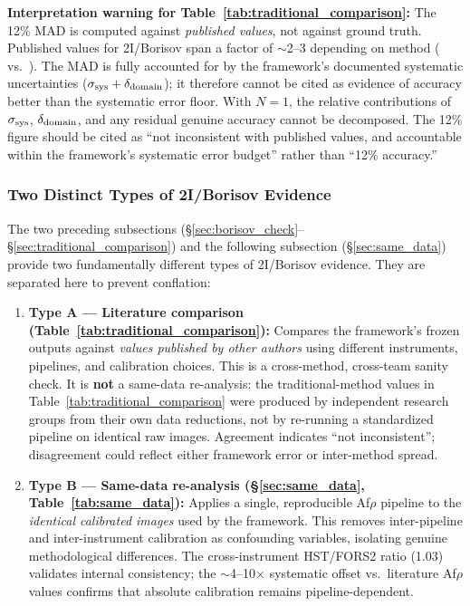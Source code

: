 \documentclass[usenatbib]{mnras}
\begin{document}
\noindent\textbf{Interpretation warning for Table~\ref{tab:traditional_comparison}:} The 12\% MAD is computed against \textit{published values}, not against ground truth. Published values for 2I/Borisov span a factor of $\sim$2--3 depending on method (\citealt{clements21} vs.\ \citealt{cremonese20}). The MAD is fully accounted for by the framework's documented systematic uncertainties ($\sigma_{\rm sys} + \delta_{\rm domain}$); it therefore cannot be cited as evidence of accuracy better than the systematic error floor. With $N=1$, the relative contributions of $\sigma_{\rm sys}$, $\delta_{\rm domain}$, and any residual genuine accuracy cannot be decomposed. The 12\% figure should be cited as ``not inconsistent with published values, and accountable within the framework's systematic error budget'' rather than ``12\% accuracy.''

\subsubsection{Two Distinct Types of 2I/Borisov Evidence}\label{sec:borisov_evidence_types}

The two preceding subsections (\S\ref{sec:borisov_check}--\S\ref{sec:traditional_comparison}) and the following subsection (\S\ref{sec:same_data}) provide two fundamentally different types of 2I/Borisov evidence. They are separated here to prevent conflation:

\begin{enumerate}
    \item \textbf{Type A --- Literature comparison (Table~\ref{tab:traditional_comparison}):} Compares the framework's frozen outputs against \textit{values published by other authors} using different instruments, pipelines, and calibration choices. This is a cross-method, cross-team sanity check. It is \textbf{not} a same-data re-analysis: the traditional-method values in Table~\ref{tab:traditional_comparison} were produced by independent research groups from their own data reductions, not by re-running a standardized pipeline on identical raw images. Agreement indicates ``not inconsistent''; disagreement could reflect either framework error or inter-method spread.

    \item \textbf{Type B --- Same-data re-analysis (\S\ref{sec:same_data}, Table~\ref{tab:same_data}):} Applies a single, reproducible Af$\rho$ pipeline to the \textit{identical calibrated images} used by the framework. This removes inter-pipeline and inter-instrument calibration as confounding variables, isolating genuine methodological differences. The cross-instrument HST/FORS2 ratio (1.03) validates internal consistency; the $\sim$4--10$\times$ systematic offset vs.\ literature Af$\rho$ values confirms that absolute calibration remains pipeline-dependent.
\end{enumerate}
\end{document}
